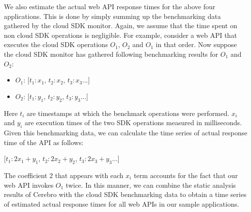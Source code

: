 
We also estimate the actual web API response times for the above four applications. 
This is done by simply summing up the benchmarking data gathered by the cloud 
SDK monitor. Again, we assume that the time spent on non cloud SDK operations
is negligible. For example,
consider a web API that executes the cloud SDK operations $O_{1}$, $O_{2}$ and $O_{1}$ in that order. 
Now suppose the cloud SDK monitor has gathered following benchmarking results for $O_{1}$ and
$O_{2}$:

\begin{itemize}
\item $O_{1}$: [$t_{1}:x_{1}$, $t_{2}:x_{2}$, $t_{3}:x_{3}$...]
\item $O_{2}$: [$t_{1}:y_{1}$, $t_{2}:y_{2}$, $t_{3}:y_{3}$...]
\end{itemize}

Here $t_{i}$ are timestamps at which the benchmark operations were performed. $x_{i}$ and $y_{i}$ are
execution times of the two SDK operations measured in milliseconds. Given this benchmarking data,
we can calculate the time series of actual response time of the API as follows:

[$t_{1}:2x_{1}+y_{1}$, $t_{2}:2x_{2}+y_{2}$, $t_{3}:2x_{3}+y_{3}$...]

The coefficient $2$ that appears with each $x_{i}$ term accounts for the fact that our web API
invokes $O_{1}$ twice. In this manner, we can combine the static analysis
results of Cerebro with the cloud SDK benchmarking data to obtain a time series of estimated
actual response times for all web APIs in our sample applications.

